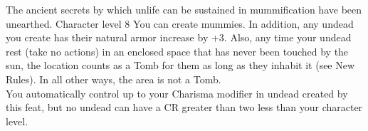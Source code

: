\shortdescfeat
{The ancient secrets by which unlife can be sustained in mummification have been unearthed.}
{Character level 8}
{You can create mummies. In addition, any undead you create has their natural armor increase by +3. Also, any time your undead rest (take no actions) in an enclosed space that has never been touched by the sun, the location counts as a Tomb for them as long as they inhabit it (see New Rules). In all other ways, the area is not a Tomb.\\
You automatically control up to your Charisma modifier in undead created by this feat, but no undead can have a CR greater than two less than your character level.}

